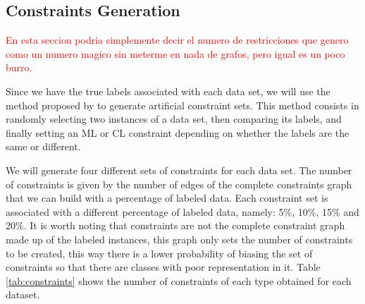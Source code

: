 \documentclass[review]{elsarticle}
\begin{document}
\clearpage

\subsection{Constraints Generation}

\textcolor{red}{En esta seccion podria simplemente decir el numero de restricciones que genero como un numero magico sin meterme en nada de grafos, pero igual es un poco burro.}

Since we have the true labels associated with each data set, we will use the method proposed by \cite{wagstaff2001constrained} to generate artificial constraint sets. This method consists in randomly selecting two instances of a data set, then comparing its labels, and finally setting an ML or CL constraint depending on whether the labels are the same or different.

We will generate four different sets of constraints for each data set. The number of constraints is given by the number of edges of the complete constraints graph that we can build with a percentage of labeled data. Each constraint set is associated with a different percentage of labeled data, namely: 5\%, 10\%, 15\% and 20\%. It is worth noting that constraints are not the complete constraint graph made up of the labeled instances, this graph only sets the number of constraints to be created, this way there is a lower probability of biasing the set of constraints so that there are classes with poor representation in it. Table \ref{tab:constraints} shows the number of constraints of each type obtained for each dataset.
\end{document}
